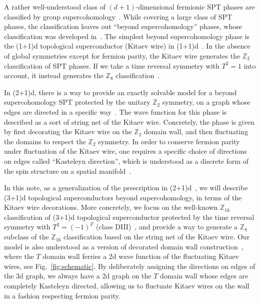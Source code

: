 \documentclass[12pt]{article}
\numberwithin{equation}{section}
\begin{document}
A rather well-understood class of $(d+1)$-dimensional fermionic SPT phases are classified by group supercohomology~\cite{Gu:2012ib}. While covering a large class of SPT phases, the classification leaves out ``beyond supercohomology'' phases, whose classification was developed in~\cite{wanggu1703, wanggu1811}.
The simplest beyond supercohomology phase is the (1+1)d topological superconductor (Kitaev wire) in (1+1)d~\cite{Kitaev00unpaired}. In the absence of global symmetries except for fermion parity, the Kitaev wire generates the $\mathbb{Z}_2$ classification of SPT phases. If we take a time reversal symmetry with $T^2=1$ into account, it instead generates the $\mathbb{Z}_8$ classification~\cite{FidkowskiKitaev2011}.

In (2+1)d, there is a way to provide an exactly solvable model for a beyond supercohomology SPT protected by the unitary $\mathbb{Z}_2$ symmetry, on a graph whose edges are directed in a specific way~\cite{Tarantino}. The wave function for this phase is described as a sort of string net of the Kitaev wire. 
Concretely, the phase is given by first decorating the Kitaev wire on the $\mathbb{Z}_2$ domain wall, and then fluctuating the domains to respect the $\mathbb{Z}_2$ symmetry. In order to conserve fermion parity under fluctuation of the Kitaev wire, one requires a specific choice of directions on edges called ``Kasteleyn direction'', which is understood as a discrete form of the spin structure on a spatial manifold~\cite{David06dimer}.

In this note, as a generalization of the prescription in (2+1)d~\cite{Tarantino}, we will describe (3+1)d topological superconductors beyond supercohomology, in terms of the Kitaev wire decorations.
More concretely, we focus on the well-known $\mathbb{Z}_{16}$ classification of (3+1)d topological superconductor protected by the time reversal symmetry with $T^2=(-1)^F$ (class DIII)~\cite{FidkowskiChenVishwanath2014}, and provide a way to generate a $\mathbb{Z}_8$ subclass of the $\mathbb{Z}_{16}$ classification based on the string net of the Kitaev wire. 
Our model is also understood as a version of decorated domain wall construction~\cite{Chen13decorated, Ware16dimer, Nat18full}, where the $T$ domain wall ferries a 2d wave function of the fluctuating Kitaev wires, see Fig.~\ref{fig:schematic}. 
By deliberately assigning the directions on edges of the 3d graph, we always have a 2d graph on the $T$ domain wall whose edges are completely Kasteleyn directed, allowing us to fluctuate Kitaev wires on the wall in a fashion respecting fermion parity.
\end{document}

